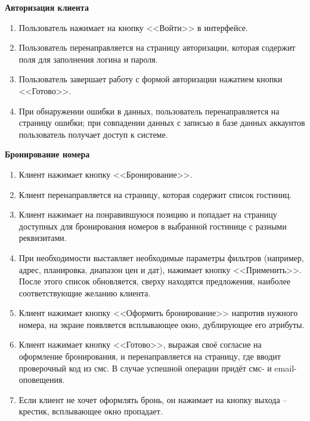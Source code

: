 \textbf{Авторизация клиента}
\begin{enumerate}
	\item Пользователь нажимает на кнопку <<Войти>> в интерфейсе.
	
	\item Пользователь перенаправляется на страницу авторизации, которая содержит поля для заполнения логина и пароля.
	
	\item Пользователь завершает работу с формой авторизации нажатием кнопки <<Готово>>.
	
	\item При обнаружении ошибки в данных, пользователь перенаправляется на страницу ошибки; при совпадении данных с записью в базе данных аккаунтов пользователь получает доступ к системе. \\
\end{enumerate}

\textbf{Бронирование номера}
\begin{enumerate}
	\item Клиент нажимает кнопку <<Бронирование>>.
	
	\item Клиент перенаправляется на страницу, которая содержит список гостиниц.
	
	\item Клиент нажимает на понравившуюся позицию и попадает на страницу доступных для бронирования номеров в выбранной гостинице с разными реквизитами.
	
	\item При необходимости выставляет необходимые параметры фильтров (например, адрес, планировка, диапазон цен и дат), нажимает кнопку <<Применить>>. После этого список обновляется, сверху находятся предложения, наиболее соответствующие желанию клиента.
	
	\item Клиент нажимает кнопку <<Оформить бронирование>> напротив нужного номера, на экране появляется всплывающее окно, дублирующее его атрибуты.
	
	\item Клиент нажимает кнопку <<Готово>>, выражая своё согласие на оформление бронирования, и перенаправляется на страницу, где вводит проверочный код из смс. В случае успешной операции придёт смс- и email-оповещения.
	
	\item Если клиент не хочет оформлять бронь, он нажимает на кнопку выхода -- крестик, всплывающее окно пропадает. \\
\end{enumerate}

